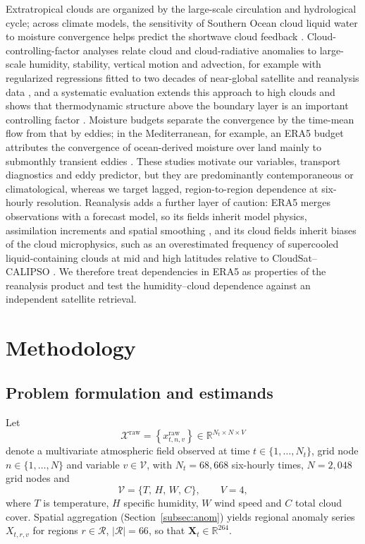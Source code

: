\documentclass[preprint,12pt]{elsarticle}
\begin{document}
Extratropical clouds are organized by the large-scale circulation and hydrological cycle; across climate models, the sensitivity of Southern Ocean cloud liquid water to moisture convergence helps predict the shortwave cloud feedback \citep{McCoy2022Extratropical}. Cloud-controlling-factor analyses relate cloud and cloud-radiative anomalies to large-scale humidity, stability, vertical motion and advection, for example with regularized regressions fitted to two decades of near-global satellite and reanalysis data \citep{Andersen2023CloudSensitivities}, and a systematic evaluation extends this approach to high clouds and shows that thermodynamic structure above the boundary layer is an important controlling factor \citep{WilsonKemsley2024HighCloud}. Moisture budgets separate the convergence by the time-mean flow from that by eddies; in the Mediterranean, for example, an ERA5 budget attributes the convergence of ocean-derived moisture over land mainly to submonthly transient eddies \citep{Tootoonchi2025Mediterranean}. These studies motivate our variables, transport diagnostics and eddy predictor, but they are predominantly contemporaneous or climatological, whereas we target lagged, region-to-region dependence at six-hourly resolution. Reanalysis adds a further layer of caution: ERA5 merges observations with a forecast model, so its fields inherit model physics, assimilation increments and spatial smoothing \citep{Soci2024ERA5}, and its cloud fields inherit biases of the cloud microphysics, such as an overestimated frequency of supercooled liquid-containing clouds at mid and high latitudes relative to CloudSat--CALIPSO \citep{Hellmuth2025CloudPhase}. We therefore treat dependencies in ERA5 as properties of the reanalysis product and test the humidity--cloud dependence against an independent satellite retrieval.

\section{Methodology}
\label{sec:method}

\subsection{Problem formulation and estimands}

Let
\begin{equation}
\mathcal{X}^{\mathrm{raw}}=\left\{x^{\mathrm{raw}}_{t,n,v}\right\}\in\mathbb{R}^{N_t\times N\times V}
\end{equation}
denote a multivariate atmospheric field observed at time $t\in\{1,\ldots,N_t\}$, grid node $n\in\{1,\ldots,N\}$ and variable $v\in\mathcal{V}$, with $N_t=68{,}668$ six-hourly times, $N=2{,}048$ grid nodes and
\begin{equation}
\mathcal{V}=\{T,\,H,\,W,\,C\},\qquad V=4,
\end{equation}
where $T$ is temperature, $H$ specific humidity, $W$ wind speed and $C$ total cloud cover. Spatial aggregation (Section~\ref{subsec:anom}) yields regional anomaly series $X_{t,r,v}$ for regions $r\in\mathcal{R}$, $|\mathcal{R}|=66$, so that $\mathbf{X}_t\in\mathbb{R}^{264}$.
\end{document}

